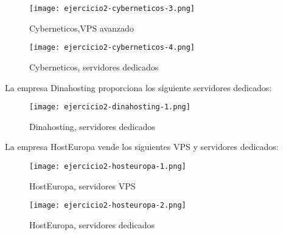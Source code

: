 	\begin{figure}[H] 
		\centering
		\texttt{[image: ejercicio2-cyberneticos-3.png]} 
		\label{figura3} 
		
		\caption{Cyberneticos,VPS avanzado} 
	\end{figure}
	
	\begin{figure}[H] 
		\centering
		\texttt{[image: ejercicio2-cyberneticos-4.png]} 
		\label{figura4} 	
		\caption{Cyberneticos, servidores dedicados} 
	\end{figure}
	
		
	La empresa Dinahosting proporciona los siguiente servidores dedicados\cite{cincuentayseis}:
	
	
	\begin{figure}[H] 
		\centering
		\texttt{[image: ejercicio2-dinahosting-1.png]} 
		\label{figura5} 	
		\caption{Dinahosting, servidores dedicados} 
	\end{figure}
	
	
	La empresa HostEuropa vende los siguientes VPS\cite{	cincuentaysiete} y servidores dedicados\cite{cincuentayocho}:


	\begin{figure}[H] 
		\centering
		\texttt{[image: ejercicio2-hosteuropa-1.png]} 
		\label{figura6} 	
		\caption{HostEuropa, servidores VPS} 
	\end{figure}
	
	\begin{figure}[H] 
		\centering
		\texttt{[image: ejercicio2-hosteuropa-2.png]} 
		\label{figura7} 	
		\caption{HostEuropa, servidores dedicados} 
	\end{figure}
	
	
	
